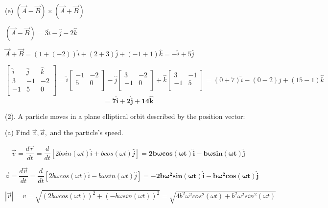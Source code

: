 \documentclass[12pt]{article}
\begin{document}
\hfill \break


(e) $(\vec{A} - \vec{B}) \times (\vec{A} + \vec{B})$

\hfill \break

$
(\vec{A} - \vec{B}) = 3\hat{i} - \hat{j} -2\hat{k}
$

$
\vec{A} + \vec{B} = (1+(-2))\hat{i} + (2 + 3)\hat{j} + (-1 + 1)\hat{k} = -\hat{i} + 5\hat{j}
$

$$
\begin{bmatrix}
    \hat{i} & \hat{j} & \hat{k} \\
	3 & -1 & -2\\
	-1 & 5 & 0 \\
\end{bmatrix}
= \hat{i}
\begin{bmatrix}
	-1 & -2\\
	5 & 0 \\
\end{bmatrix}
- \hat{j}
\begin{bmatrix}
	3 & -2\\
	-1 & 0 \\
\end{bmatrix}
+ \hat{k}
\begin{bmatrix}
	3 & -1\\
	-1 & 5 \\
\end{bmatrix}
= (0 + 7)\hat{i} - (0 - 2) \hat{j} + (15 - 1) \hat{k} 
$$
$$
= \boldsymbol{7\hat{i} + 2\hat{j} + 14 \hat{k}}
$$


(2). A particle moves in a plane elliptical orbit described by the position vector:

\large{}

\hfill \break

(a) Find $\vec{v}, \vec{a}, $ and the particle's speed.

$$
\vec{v} = \frac{d \vec{r}}{dt} = \frac{d}{dt}[2bsin(\omega t) \hat{i} + bcos(\omega t) \hat{j}] = \boldsymbol{2b \omega cos(\omega t) \hat{i} - b\omega sin(\omega t) \hat{j}}
$$

$$
\vec{a} = \frac{d \vec{v}}{dt} = \frac{d}{dt}[2b \omega cos(\omega t) \hat{i} - b\omega sin(\omega t) \hat{j}] = \boldsymbol{ -2b \omega^2 sin(\omega t) \hat{i} - b\omega^2 cos(\omega t) \hat{j} }
$$

$$
|\vec{v}| = v = \sqrt{(2b \omega cos(\omega t))^2 + (-b\omega sin(\omega t))^2} = \sqrt{4b^2 \omega^2 cos^2(\omega t) + b^2 \omega^2 sin^2(\omega t)}
$$
\end{document}
